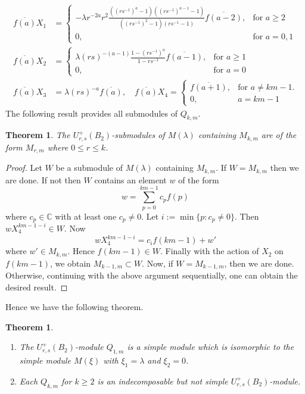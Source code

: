\documentclass[12 pt,reqno]{amsart}
\numberwithin{equation}{section}
\newtheorem{theorem}[thm]{Theorem}
\theoremstyle{definition}
\theoremstyle{definition}
\theoremstyle{remark}
\theoremstyle{remark}
\begin{document}
\begin{align*}
    \overline{f(a)}X_1&=\begin{cases}
       \displaystyle -\lambda r^{-2a}r^2\frac{\left((rs^{-1})^a-1\right)\left((rs^{-1})^{a-1}-1\right)}{\left((rs^{-1})^2-1\right)\left(rs^{-1}-1\right)}\overline{f(a-2)}, & \text{for } a\geq 2\\
       0, & \text{for } a=0,1
       \end{cases}\\
\overline{f(a)}X_2&=\begin{cases}
    \displaystyle\lambda (rs)^{-(a-1)}\frac{1-(rs^{-1})^a}{1-rs^{-1}}\overline{f(a-1)}, &\text{for } a\geq 1\\
    0,& \text{for } a= 0
    \end{cases}\\
   \overline{f(a)}X_3&= \lambda(rs)^{-a}\overline{f(a)}, \quad \overline{f(a)}X_4=\begin{cases}
       \overline{f(a+1)},& \text{for } a\neq km-1.\\
       0,&a=km-1
   \end{cases}
\end{align*}
The following result provides all submodules of $Q_{k,m}$.
\begin{theorem}
    The $U_{r,s}^+(B_2)$-submodules of $M(\lambda)$ containing $M_{k,m}$ are of the form $M_{r,m}$ where $0 \leq r \leq k$.
\end{theorem}
\begin{proof}
    Let $W$ be a submodule of $M(\lambda)$ containing $M_{k,m}$. If $W=M_{k,m}$ then we are done. If not then $W$ contains an element $w$ of the form 
    \[w=\sum_{p=0}^{km-1}c_pf(p)\] where $c_p \in \mathbb{C}$ with at least one $c_p \neq 0$. Let $i:=\operatorname{min}\{p:c_p\neq 0\}$. Then $wX_4^{km-1-i}\in W$. Now 
    \[wX_4^{km-1-i}=c_i f(km-1)+w'\] where $w'\in M_{k,m}$. Hence $f(km-1)\in W$. Finally with the action of $X_2$ on $f(km-1)$, we obtain $M_{k-1,m}\subset W$. Now, if $W = M_{k-1,m}$, then we are done. Otherwise, continuing with the above argument sequentially, one can obtain the desired result.
\end{proof}
Hence we have the following theorem.
\begin{theorem}
    \begin{enumerate}[label= \((\arabic*)\)]
        \item The $U_{r,s}^+(B_2)$-module $Q_{1,m}$ is a simple module which is isomorphic to the simple module $M(\xi)$ with $\xi_1=\lambda$ and $\xi_2=0$.
        \item Each $Q_{k,m}$ for $k \geq 2$ is an indecomposable but not simple $U_{r,s}^+(B_2)$-module.
    \end{enumerate}
\end{theorem}
\end{document}
